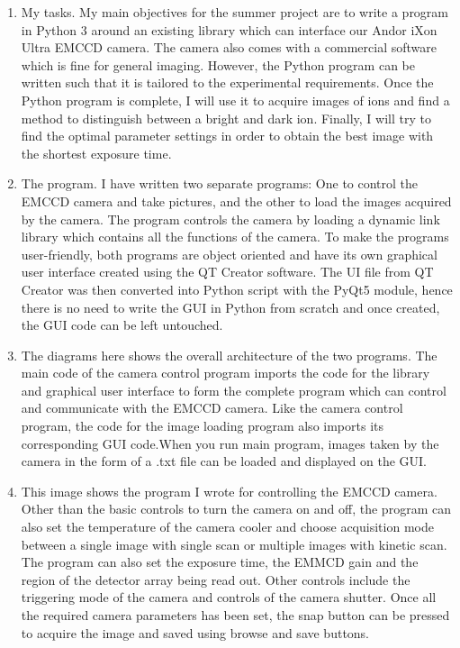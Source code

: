\documentclass[12pt]{article}
\begin{document}
\begin{enumerate}
\item My tasks. My main objectives for the summer project are to write a program in Python 3 around an existing library which can interface our Andor iXon Ultra EMCCD camera. The camera also comes with a commercial software which is fine for general imaging. However, the Python program can be written such that it is tailored to the experimental requirements. Once the Python program is complete, I will use it to acquire images of ions and find a method to distinguish between a bright and dark ion. Finally, I will try to find the optimal parameter settings in order to obtain the best image with the shortest exposure time.

\item The program. I have written two separate programs: One to control the EMCCD camera and take pictures, and the other to load the images acquired by the camera.  The program controls the camera by loading a dynamic link library which contains all the functions of the camera. To make the programs user-friendly, both programs are object oriented and have its own graphical user interface created using the QT Creator software. The UI file from QT Creator was then converted into Python script with the PyQt5 module, hence there is no need to write the GUI in Python from scratch and once created, the GUI code can be left untouched.

\item The diagrams here shows the overall architecture of the two programs. The main code of the camera control program imports the code for the library and graphical user interface to form the complete program which can control and communicate with the EMCCD camera. Like the camera control program, the code for the image loading program also imports its corresponding  GUI code.When you run main program, images taken by the camera in the form of a .txt file can be loaded and displayed on the GUI.

\item This image shows the program I wrote for controlling the EMCCD camera. Other than the basic controls to turn the camera on and off, the program can also set the temperature of the camera cooler and choose acquisition mode between a single image with single scan or multiple images with kinetic scan. The program can also set the exposure time, the EMMCD gain and the region of the detector array being read out. Other controls include the triggering mode of the camera and controls of the camera shutter. Once all the required camera parameters has been set, the snap button can be pressed to acquire the image and saved using browse and save buttons.


\end{enumerate}
\end{document}
